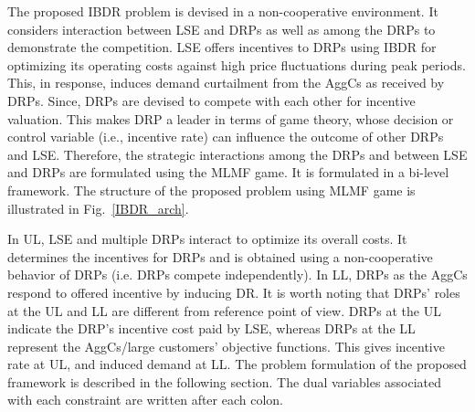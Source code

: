 \documentclass[journal]{IEEEtran}
\begin{document}
The proposed IBDR problem is devised in a non-cooperative environment. It considers interaction between LSE and DRPs as well as among the DRPs to demonstrate the competition. LSE offers incentives to DRPs using IBDR for optimizing its operating costs against high price fluctuations during peak periods\mbox{\cite{li2016dynamic,zhong2012coupon}}. This, in response, induces demand curtailment from the AggCs as received by DRPs. Since, DRPs are devised to compete with each other for incentive valuation. This makes DRP a leader in terms of game theory, whose decision or control variable (i.e., incentive rate) can influence the outcome of other DRPs and LSE\mbox{\cite{su2004sequential,facchinei2007generalized}}. Therefore, the strategic interactions among the DRPs and between LSE and DRPs are formulated using the MLMF game\mbox{\cite{su2004sequential,haghighat2012bilevel}}. It is formulated in a bi-level framework. The structure of the proposed problem using MLMF game is illustrated in Fig.~\mbox{\ref{IBDR_arch}}.



In UL, LSE and multiple DRPs interact to optimize its overall costs. It determines the incentives for DRPs and is obtained using a non-cooperative behavior of DRPs (i.e. DRPs compete independently). In LL, DRPs as the AggCs respond to offered incentive by inducing DR\mbox{\cite{wang2019ensuring}}. It is worth noting that DRPs' roles at the UL and LL are different from reference point of view. DRPs at the UL indicate the DRP's incentive cost paid by LSE, whereas DRPs at the LL represent the AggCs/large customers' objective functions. This gives incentive rate at UL, and induced demand at LL. The problem formulation of the proposed framework is described in the following section. The dual variables associated with each constraint are written after each colon. 


\vspace{-2mm}
\end{document}
